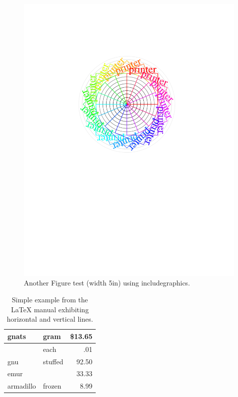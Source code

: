 \documentclass{article}
\begin{document}
\begin{figure}
\includegraphics[width=5in]{fig_testc}
\caption{Another Figure test (width 5in) using includegraphics.} 
\label{figure3}
\end{figure}


\begin{table}
\begin{center}
\begin{tabular}{||l|lr||}
\hline
gnats     & gram    & \$13.65 \\
\hline
          & each    &     .01 \\
\hline
gnu       & stuffed &   92.50 \\
\cline{1-1} \cline{3-3}
emur      &         &   33.33 \\
armadillo & frozen  &    8.99 \\
\hline
\end{tabular}
\caption{Simple example from the \LaTeX{} manual exhibiting horizontal
and vertical lines.}
\end{center}
\end{table}
\end{document}
